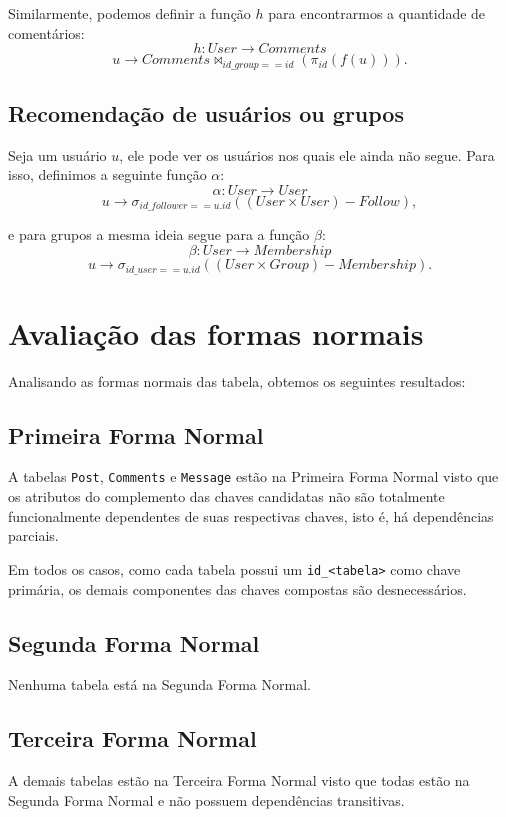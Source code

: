 \documentclass{article}
\begin{document}
Similarmente, podemos definir a função $h$ para encontrarmos a quantidade de comentários:
$$h: User \rightarrow Comments$$
$$u \rightarrow Comments \bowtie_{id\_group == id} (\pi_{id}(f(u))).$$

\subsection{Recomendação de usuários ou grupos}
Seja um usuário $u$, ele pode ver os usuários nos quais ele ainda não segue. Para isso, definimos a seguinte função $\alpha$:
$$\alpha: User \rightarrow User$$
$$u \rightarrow \sigma_{id\_follower == u.id}((User \times User) - Follow),$$

e para grupos a mesma ideia segue para a função $\beta$:
$$\beta: User \rightarrow Membership$$
$$u \rightarrow \sigma_{id\_user == u.id}((User \times Group) - Membership).$$

\section{Avaliação das formas normais}
Analisando as formas normais das tabela, obtemos os seguintes resultados:
\subsection{Primeira Forma Normal}
A tabelas \verb|Post|, \verb|Comments| e \verb|Message| estão na Primeira Forma Normal visto que os atributos do complemento das chaves candidatas não são totalmente funcionalmente dependentes de suas respectivas chaves, isto é, há dependências parciais.

Em todos os casos, como cada tabela possui um \verb|id_<tabela>| como chave primária, os demais componentes das chaves compostas são desnecessários.

\subsection{Segunda Forma Normal}
Nenhuma tabela está na Segunda Forma Normal.

\subsection{Terceira Forma Normal}
A demais tabelas estão na Terceira Forma Normal visto que todas estão na Segunda Forma Normal e não possuem dependências transitivas.
\end{document}
